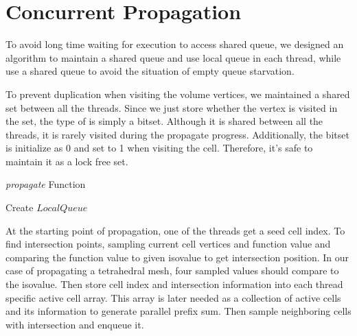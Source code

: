 \documentclass[11pt, b5paper]{report}
\begin{document}
\section{Concurrent Propagation}
To avoid long time waiting for execution to access shared queue, we designed 
an algorithm to maintain a shared queue and use local queue in each thread,
while use a shared queue to avoid the situation of empty queue starvation.

To prevent duplication when visiting the volume vertices, we maintained a
shared set between all the threads. Since we just store whether the vertex
is visited in the set, the type of is simply a bitset. Although it is shared
between all the threads, it is rarely visited during the propagate progress.
Additionally, the bitset is initialize as 0 and set to 1 when visiting the 
cell. Therefore, it's safe to maintain it as a lock free set.


\begin{algorithm}[htb]
  \caption[Parallel propagate function]
  {\emph{propagate} Function\label{alg:propagate}}
  \SetLine
  Create $LocalQueue$\;
\end{algorithm}

At the starting point of propagation, one of the threads get a seed cell index.
To find intersection points, sampling current cell vertices and function value
and comparing the function value to given isovalue to get intersection 
position. In our case of propagating a tetrahedral mesh, four
sampled values should compare to the isovalue. Then store cell index and 
intersection information into each thread specific active cell array.
This array is later needed as a collection of active cells and its information
to generate parallel prefix sum. Then sample neighboring cells with 
intersection and enqueue it.
\end{document}
